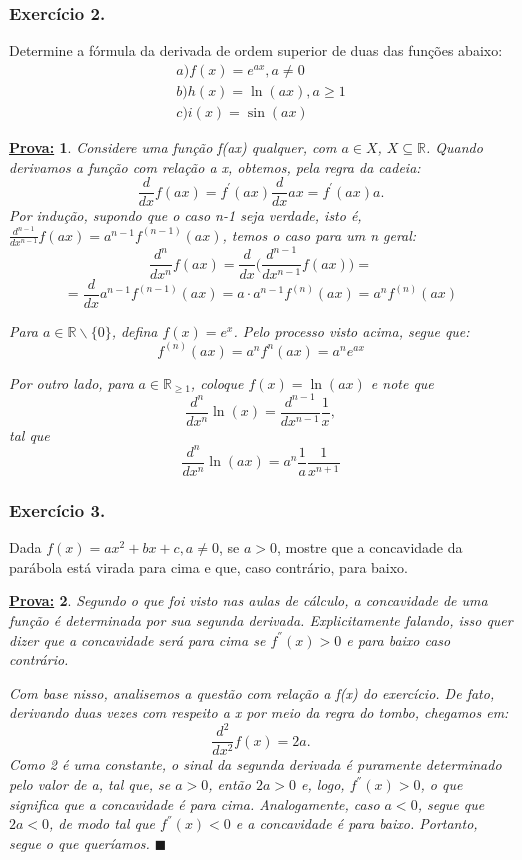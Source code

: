\documentclass{article}
\newtheorem*{proof*}{\underline{Prova:}}
\renewcommand\qedsymbol{$\blacksquare$}
\begin{document}
\subsubsection{Exerc\'icio 2.}
Determine a f\'ormula da derivada de ordem superior de duas das fun\c c\~oes abaixo:
\begin{align*}
	a)f(x) = e^{ax}, a\neq{0} \\
	b)h(x) = \ln(ax), a\geq1  \\
	c)i(x) = \sin(ax)
\end{align*}

\begin{proof*}
	Considere uma fun\c c\~ao f(ax) qualquer, com $a\in{X}$, $X\subseteq{\mathbb{R}}$.
	Quando derivamos a fun\c c\~ao com rela\c c\~ao a x, obtemos, pela regra da
	cadeia:
	\[
		\frac{d}{dx}f(ax) = f^{'}(ax)\frac{d}{dx}ax = f^{'}(ax)a.
	\]
	Por indu\c c\~ao, supondo que o caso n-1 seja verdade, isto \'e,
	$\frac{d^{n-1}}{d x^{n-1}}f(ax) = a^{n-1}f^{(n-1)}(ax)$, temos o caso para um n
	geral:
	\[
		\frac{d^{n}}{d x^{n}}f(ax) = \frac{d}{dx}\biggl(\frac{d^{n-1}}{d x^{n-1}}f(ax)\biggr) =
	\]
	\[
		= \frac{d}{dx}a^{n-1}f^{(n-1)}(ax) = a\cdot{a^{n-1}}f^{(n)}(ax) = a^{n}f^{(n)}(ax)
	\]

	Para $a\in{\mathbb{R}\backslash\{0\}}$, defina $f(x) = e^{x}$. Pelo processo visto
	acima, segue que:
	\[
		f^{(n)}(ax) = a^{n}f^{n}(ax) = a^{n}e^{ax}
	\]

	Por outro lado, para $a\in{\mathbb{R}_{\geq1}}$, coloque $f(x) = \ln(ax)$ e
	note que
	\[
		\frac{d^{n}}{dx^{n}}\ln(x) = \frac{d^{n-1}}{dx^{n-1}}\frac{1}{x},
	\]
	tal que
	\[
		\frac{d^{n}}{dx^{n}}\ln(ax) = a^{n}\frac{1}{a}\frac{1}{x^{n+1}}
	\]
\end{proof*}

\subsubsection{Exerc\'icio 3.}
Dada $f(x) = ax^{2}+ bx + c, a\neq{0}$, se $a > 0$, mostre que a concavidade da
par\'abola est\'a virada para cima e que, caso contr\'ario, para baixo.

\begin{proof*}
	Segundo o que foi visto nas aulas de c\'alculo, a concavidade de uma fun\c c\~ao
	\'e determinada por sua segunda derivada. Explicitamente falando, isso quer
	dizer que a concavidade ser\'a para cima se $f^{''}(x) > 0$ e para baixo caso
	contr\'ario.

	Com base nisso, analisemos a quest\~ao com rela\c c\~ao a f(x) do exerc\'icio.
	De fato, derivando duas vezes com respeito a x por meio da regra do tombo,
	chegamos em:
	\[
		\frac{d^{2}}{dx^{2}}f(x) = 2a.
	\]
	Como 2 \'e uma constante, o sinal da segunda derivada \'e puramente
	determinado pelo valor de a, tal que, se $a > 0$, ent\~ao $2a > 0$ e, logo, $f^{''}
		(x) > 0$, o que significa que a concavidade \'e para cima. Analogamente, caso $a
		< 0$, segue que $2a < 0$, de modo tal que $f^{''}(x) < 0$ e a concavidade \'e
	para baixo. Portanto, segue o que quer\'iamos. \qedsymbol
\end{proof*}
\end{document}
